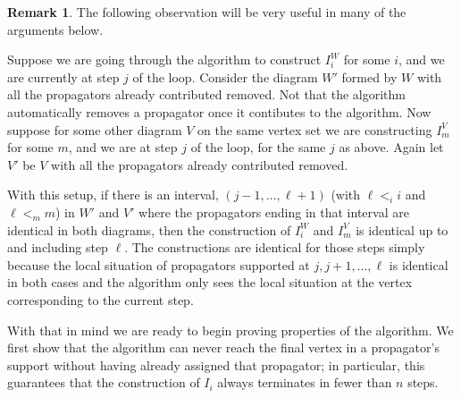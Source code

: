 \documentclass[11pt]{article}
\newcommand{\sanote}{\todo[color=violet!30]}
\theoremstyle{remark}
\theoremstyle{definition}
\newtheorem{rmk}[thm]{Remark}
\begin{document}
\begin{rmk}\label{rmk algorithm locally same}
The following observation will be very useful in many of the arguments below.  

Suppose we are going through the algorithm to construct $I_i^W$ for some $i$, and we are currently at step $j$ of the loop.  Consider the diagram $W'$ formed by $W$ with all the propagators already contributed removed. Not that the algorithm automatically removes a propagator once it contibutes to the algorithm.  Now suppose for some other diagram $V$ on the same vertex set we are constructing $I_m^V$ for some $m$, and we are at step $j$ of the loop, for the same $j$ as above.  Again let $V'$ be $V$ with all the propagators already contributed removed. \sanote{rewrote, do we like this?}

With this setup, if there is an interval, $(j-1, \ldots, \ell+1)$ (with $\ell <_i i$ and $\ell <_m m$) in $W'$ and $V'$ where the propagators ending in that interval are identical in both diagrams, then the construction of $I_i^W$ and $I_m^V$ is identical up to and including step $\ell$.  The constructions are identical for those steps simply because the local situation of propagators supported at $j, j+1, \ldots, \ell$ is identical in both cases and the algorithm only sees the local situation at the vertex corresponding to the current step.
\end{rmk}

With that in mind we are ready to begin proving properties of the algorithm. We first show that the algorithm can never reach the final vertex in a propagator's support without having already assigned that propagator; in particular, this guarantees that the construction of $I_i$ always terminates in fewer than $n$ steps.
\end{document}
